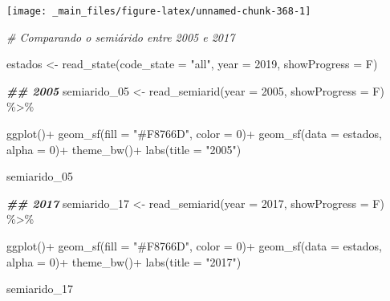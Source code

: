 \documentclass[
  brazilian,
]{book}
\newenvironment{Shaded}{\begin{snugshade}}{\end{snugshade}}
\newcommand{\AttributeTok}[1]{\textcolor[rgb]{0.77,0.63,0.00}{#1}}
\newcommand{\CommentTok}[1]{\textcolor[rgb]{0.56,0.35,0.01}{\textit{#1}}}
\newcommand{\DecValTok}[1]{\textcolor[rgb]{0.00,0.00,0.81}{#1}}
\newcommand{\DocumentationTok}[1]{\textcolor[rgb]{0.56,0.35,0.01}{\textbf{\textit{#1}}}}
\newcommand{\FunctionTok}[1]{\textcolor[rgb]{0.00,0.00,0.00}{#1}}
\newcommand{\NormalTok}[1]{#1}
\newcommand{\OtherTok}[1]{\textcolor[rgb]{0.56,0.35,0.01}{#1}}
\newcommand{\SpecialCharTok}[1]{\textcolor[rgb]{0.00,0.00,0.00}{#1}}
\newcommand{\StringTok}[1]{\textcolor[rgb]{0.31,0.60,0.02}{#1}}
\begin{document}
\begin{center}\texttt{[image: \_main\_files/figure-latex/unnamed-chunk-368-1]} \end{center}

\begin{Shaded}
\begin{Highlighting}[]
\CommentTok{\# Comparando o semiárido entre 2005 e 2017}

\NormalTok{estados }\OtherTok{\textless{}{-}} \FunctionTok{read\_state}\NormalTok{(}\AttributeTok{code\_state =} \StringTok{"all"}\NormalTok{,}
                      \AttributeTok{year =} \DecValTok{2019}\NormalTok{,}
                      \AttributeTok{showProgress =}\NormalTok{ F)}

\DocumentationTok{\#\# 2005}
\NormalTok{semiarido\_05 }\OtherTok{\textless{}{-}} \FunctionTok{read\_semiarid}\NormalTok{(}\AttributeTok{year =} \DecValTok{2005}\NormalTok{,}
                              \AttributeTok{showProgress =}\NormalTok{ F) }\SpecialCharTok{\%\textgreater{}\%} 
  
  \FunctionTok{ggplot}\NormalTok{()}\SpecialCharTok{+}
  \FunctionTok{geom\_sf}\NormalTok{(}\AttributeTok{fill =} \StringTok{"\#F8766D"}\NormalTok{,}
          \AttributeTok{color =} \DecValTok{0}\NormalTok{)}\SpecialCharTok{+}
  \FunctionTok{geom\_sf}\NormalTok{(}\AttributeTok{data =}\NormalTok{ estados,}
          \AttributeTok{alpha =} \DecValTok{0}\NormalTok{)}\SpecialCharTok{+}
  \FunctionTok{theme\_bw}\NormalTok{()}\SpecialCharTok{+}
  \FunctionTok{labs}\NormalTok{(}\AttributeTok{title =} \StringTok{"2005"}\NormalTok{)}

\NormalTok{semiarido\_05}
\end{Highlighting}
\end{Shaded}

\begin{Shaded}
\begin{Highlighting}[]
\DocumentationTok{\#\# 2017}
\NormalTok{semiarido\_17 }\OtherTok{\textless{}{-}} \FunctionTok{read\_semiarid}\NormalTok{(}\AttributeTok{year =} \DecValTok{2017}\NormalTok{,}
                              \AttributeTok{showProgress =}\NormalTok{ F) }\SpecialCharTok{\%\textgreater{}\%} 
  
  \FunctionTok{ggplot}\NormalTok{()}\SpecialCharTok{+}
  \FunctionTok{geom\_sf}\NormalTok{(}\AttributeTok{fill =} \StringTok{"\#F8766D"}\NormalTok{,}
          \AttributeTok{color =} \DecValTok{0}\NormalTok{)}\SpecialCharTok{+}
  \FunctionTok{geom\_sf}\NormalTok{(}\AttributeTok{data =}\NormalTok{ estados,}
          \AttributeTok{alpha =} \DecValTok{0}\NormalTok{)}\SpecialCharTok{+}
  \FunctionTok{theme\_bw}\NormalTok{()}\SpecialCharTok{+}
  \FunctionTok{labs}\NormalTok{(}\AttributeTok{title =} \StringTok{"2017"}\NormalTok{)}

\NormalTok{semiarido\_17}
\end{Highlighting}
\end{Shaded}
\end{document}
